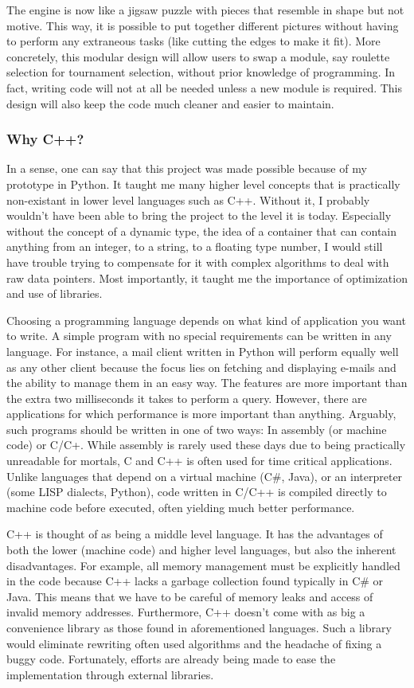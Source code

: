 The engine is now like a jigsaw puzzle with pieces that resemble in shape but not motive. This way, it is possible to put together different pictures without having to perform any extraneous tasks (like cutting the edges to make it fit). More concretely, this modular design will allow users to swap a module, say roulette selection for tournament selection, without prior knowledge of programming. In fact, writing code will not at all be needed unless a new module is required. This design will also keep the code much cleaner and easier to maintain.

\subsubsection{Why C++?}
In a sense, one can say that this project was made possible because of my prototype in Python. It taught me many higher level concepts that is practically non-existant in lower level languages such as C++. Without it, I probably wouldn't have been able to bring the project to the level it is today. Especially without the concept of a dynamic type, the idea of a container that can contain anything from an integer, to a string, to a floating type number, I would still have trouble trying to compensate for it with complex algorithms to deal with raw data pointers. Most importantly, it taught me the importance of optimization and use of libraries.

Choosing a programming language depends on what kind of application you want to write. A simple program with no special requirements can be written in any language. For instance, a mail client written in Python will perform equally well as any other client because the focus lies on fetching and displaying e-mails and the ability to manage them in an easy way. The features are more important than the extra two milliseconds it takes to perform a query. However, there are applications for which performance is more important than anything. Arguably, such programs should be written in one of two ways: In assembly (or machine code) or C/C+. While assembly is rarely used these days due to being practically unreadable for mortals, C and C++ is often used for time critical applications. Unlike languages that depend on a virtual machine (C\#, Java), or an interpreter (some LISP dialects, Python), code written in C/C++ is compiled directly to machine code before executed, often yielding much better performance.

C++ is thought of as being a middle level language. It has the advantages of both the lower (machine code) and higher level languages, but also the inherent disadvantages. For example, all memory management must be explicitly handled in the code because C++ lacks a garbage collection found typically in C\# or Java. This means that we have to be careful of memory leaks and access of invalid memory addresses. Furthermore, C++ doesn't come with as big a convenience library as those found in aforementioned languages. Such a library would eliminate rewriting often used algorithms and the headache of fixing a buggy code. Fortunately, efforts are already being made to ease the implementation through external libraries.


